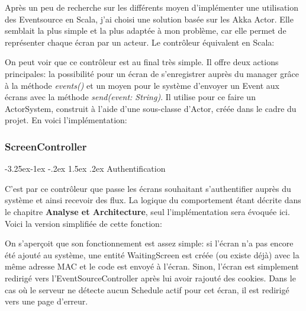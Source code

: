 \documentclass[french]{article}
\makeatletter
\renewcommand\paragraph{\@startsection{paragraph}{4}{\z@}%
                                     {-3.25ex\@plus -1ex \@minus -.2ex}%
                                     {1.5ex \@plus .2ex}%
                                     {\normalfont\normalsize\bfseries}}
\makeatother
\begin{document}
Après un peu de recherche sur les différents moyen d'implémenter une utilisation des Eventsource en Scala, j'ai choisi une solution basée sur les Akka Actor. Elle semblait la plus simple et la plus adaptée à mon problème, car elle permet de représenter chaque écran par un acteur. \newline
Le contrôleur équivalent en Scala:



On peut voir que ce contrôleur est au final très simple. Il offre deux actions principales: la possibilité pour un écran de s'enregistrer auprès du manager grâce à la méthode \textit{events()} et un moyen pour le système d'envoyer un Event aux écrans avec la méthode \textit{send(event: String)}. \newline
Il utilise pour ce faire un ActorSystem, construit à l'aide d'une sous-classe d'Actor, créée dans le cadre du projet. En voici l'implémentation:



\subsubsection{ScreenController}

\paragraph{Authentification}

C'est par ce contrôleur que passe les écrans souhaitant s'authentifier auprès du système et ainsi recevoir des flux. La logique du comportement étant décrite dans le chapitre \textbf{Analyse et Architecture}, seul l'implémentation sera évoquée ici. \newline
Voici la version simplifiée de cette fonction:


On s'aperçoit que son fonctionnement est assez simple: si l'écran n'a pas encore été ajouté au système, une entité WaitingScreen est créée (ou existe déjà) avec la même adresse MAC et le code est envoyé à l'écran. Sinon, l'écran est simplement redirigé vers l'EventSourceController après lui avoir rajouté des cookies. Dans le cas où le serveur ne détecte aucun Schedule actif pour cet écran, il est redirigé vers une page d'erreur.
\end{document}
